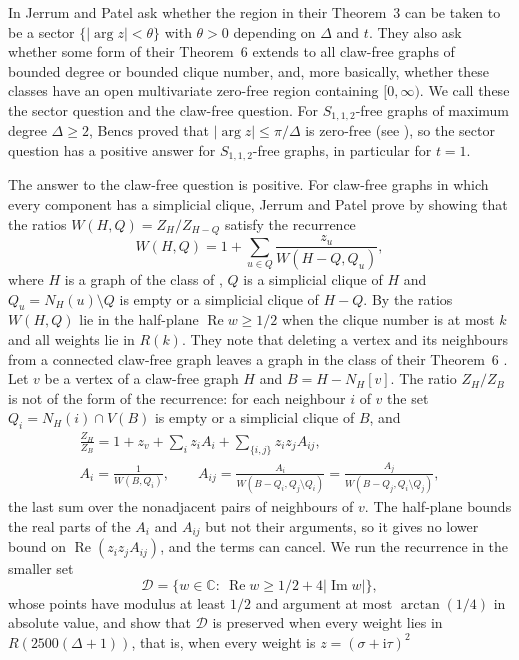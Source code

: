 \documentclass[11pt]{article}
\theoremstyle{remark}
\renewcommand{\Re}{\operatorname{Re}}
\renewcommand{\Im}{\operatorname{Im}}
\newcommand{\D}{\mathcal D}
\begin{document}
In \cite[Section~7]{JP} Jerrum and Patel ask whether the region in their Theorem~3 can be taken to be a sector
$\{|\arg z|<\theta\}$ with $\theta>0$ depending on $\Delta$ and $t$. They also ask whether some form of their Theorem~6 extends to
all claw-free graphs of bounded degree or bounded clique number, and, more basically, whether these classes have an open
multivariate zero-free region containing $[0,\infty)$. We call these the sector question and the claw-free question. For $S_{1,1,2}$-free graphs
of maximum degree $\Delta\ge2$, Bencs \cite{Bencs} proved that $|\arg z|\le\pi/\Delta$ is zero-free (see
\cite[Section~1]{JP}), so the sector question has a positive answer for $S_{1,1,2}$-free graphs, in particular for
$t=1$.

The answer to the claw-free question is positive. For claw-free graphs in which every component has a simplicial clique,
Jerrum and Patel prove \cite[Theorem~6]{JP} by showing that the ratios $W(H,Q)=Z_H/Z_{H-Q}$ satisfy the recurrence
\[
W(H,Q)=1+\sum_{u\in Q}\frac{z_u}{W(H-Q,Q_u)},
\]
where $H$ is a graph of the class of \cite[Theorem~6]{JP}, $Q$ is a simplicial clique of $H$ and $Q_u=N_H(u)\setminus Q$ is empty or a simplicial clique of $H-Q$. By
\cite[Lemma~12]{JP} the ratios $W(H,Q)$ lie in the half-plane $\Re w\ge1/2$ when the clique number is at most $k$
and all weights lie in $R(k)$. They note that deleting a vertex and its
neighbours from a connected claw-free graph leaves a graph in the class of their Theorem~6 \cite[Section~1]{JP}.
Let $v$ be a vertex of a claw-free graph $H$ and $B=H-N_H[v]$. The ratio $Z_H/Z_B$ is not of the form of the
recurrence: for each
neighbour $i$ of $v$ the set $Q_i=N_H(i)\cap V(B)$ is empty or a simplicial clique of $B$, and
\[
\begin{gathered}
\frac{Z_H}{Z_B}=1+z_v+\sum_{i}z_iA_i+\sum_{\{i,j\}}z_iz_jA_{ij},\\
A_i=\frac1{W(B,Q_i)},\qquad A_{ij}=\frac{A_i}{W(B-Q_i,Q_j\setminus Q_i)}=\frac{A_j}{W(B-Q_j,Q_i\setminus Q_j)},
\end{gathered}
\]
the last sum over the nonadjacent pairs of neighbours of $v$. The half-plane bounds the real parts of the $A_i$ and
$A_{ij}$ but not their arguments, so it gives no lower bound on $\Re(z_iz_jA_{ij})$, and the terms can cancel. We run
the recurrence in the smaller set
\[
\D=\{w\in\mathbb C:\ \Re w\ge1/2+4|\Im w|\},
\]
whose points have modulus at least $1/2$ and argument at most $\arctan(1/4)$ in absolute value, and show that $\D$ is
preserved when every weight lies in $R(2500(\Delta+1))$, that is, when every weight is $z=(\sigma+\mathrm i\tau)^2$
\end{document}
